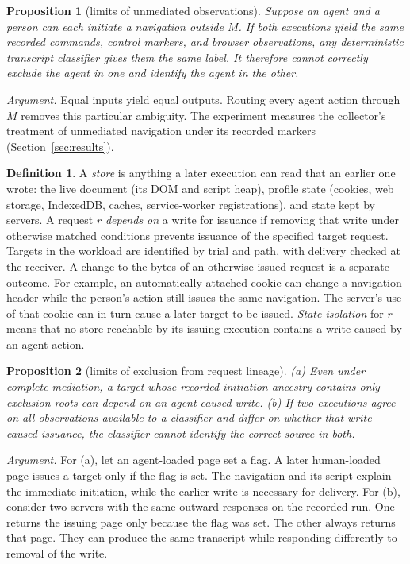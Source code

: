 \documentclass[11pt]{article}
\newtheorem{proposition}{Proposition}
\theoremstyle{definition}
\newtheorem{definition}{Definition}
\begin{document}
\begin{proposition}[limits of unmediated observations]\label{prop:exclusion}
Suppose an agent and a person can each initiate a navigation outside $M$. If both
executions yield the same recorded commands, control markers, and browser observations,
any deterministic transcript classifier gives them the same label. It therefore cannot
correctly exclude the agent in one and identify the agent in the other.
\end{proposition}
\noindent\emph{Argument.} Equal inputs yield equal outputs. Routing every agent action
through $M$ removes this particular ambiguity. The experiment measures the collector's
treatment of unmediated navigation under its recorded markers
(Section~\ref{sec:results}). \hfill\qedsymbol

\begin{definition}
A \emph{store} is anything a later execution can read that an earlier one wrote:
the live document (its DOM and script heap), profile state (cookies, web storage,
IndexedDB, caches, service-worker registrations), and state kept by servers. A
request $r$ \emph{depends on} a write for issuance if removing that write under
otherwise matched conditions prevents issuance of the specified target request. Targets
in the workload are identified by trial and path, with delivery checked at the receiver.
A change to the bytes of an otherwise issued request is a separate outcome. For example,
an automatically attached cookie can change a navigation header while the person's
action still issues the same navigation. The server's use of that cookie can in turn
cause a later target to be issued.
\emph{State isolation} for $r$ means that no store reachable by its issuing execution contains a write caused by an agent action.
\end{definition}

\begin{proposition}[limits of exclusion from request lineage]\label{prop:state}
(a) Even under complete mediation, a target whose recorded initiation ancestry contains only exclusion roots can depend on an agent-caused write.
(b) If two executions agree on all observations available to a classifier and differ on whether that write caused issuance, the classifier cannot identify the correct source in both.
\end{proposition}
\noindent\emph{Argument.} For (a), let an agent-loaded page set a flag. A later
human-loaded page issues a target only if the flag is set. The navigation and its script
explain the immediate initiation, while the earlier write is necessary for delivery. For
(b), consider two servers with the same outward responses on the recorded run. One
returns the issuing page only because the flag was set. The other always returns that
page. They can produce the same transcript while responding differently to removal of
the write. \hfill\qedsymbol
\end{document}
